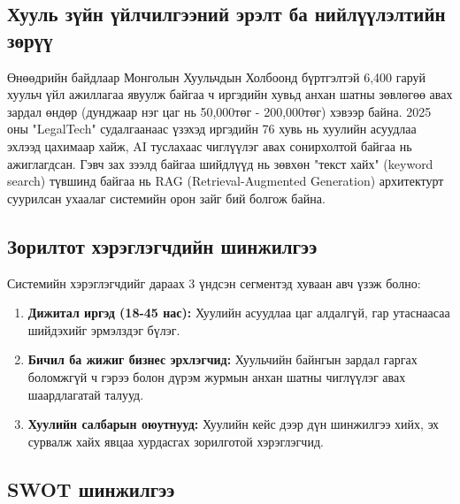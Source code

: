 \subsection{Хууль зүйн үйлчилгээний эрэлт ба нийлүүлэлтийн зөрүү}

Өнөөдрийн байдлаар Монголын Хуульчдын Холбоонд бүртгэлтэй 6,400 гаруй хуульч үйл ажиллагаа явуулж байгаа ч иргэдийн хувьд анхан шатны зөвлөгөө авах зардал өндөр (дунджаар нэг цаг нь 50,000төг - 200,000төг) хэвээр байна. 2025 оны "LegalTech" судалгаанаас үзэхэд иргэдийн 76 хувь нь хуулийн асуудлаа эхлээд цахимаар хайж, AI туслахаас чиглүүлэг авах сонирхолтой байгаа нь ажиглагдсан. Гэвч зах зээлд байгаа шийдлүүд нь зөвхөн "текст хайх" (keyword search) түвшинд байгаа нь RAG (Retrieval-Augmented Generation) архитектурт суурилсан ухаалаг системийн орон зайг бий болгож байна.
\subsection{Зорилтот хэрэглэгчдийн шинжилгээ}

Системийн хэрэглэгчдийг дараах 3 үндсэн сегментэд хуваан авч үзэж болно:

\begin{enumerate}
    \item \textbf{Дижитал иргэд (18-45 нас):} Хуулийн асуудлаа цаг алдалгүй, гар утаснаасаа шийдэхийг эрмэлздэг бүлэг.
    
    \item \textbf{Бичил ба жижиг бизнес эрхлэгчид:} Хуульчийн байнгын зардал гаргах боломжгүй ч гэрээ болон дүрэм журмын анхан шатны чиглүүлэг авах шаардлагатай талууд.
    
    \item \textbf{Хуулийн салбарын оюутнууд:} Хуулийн кейс дээр дүн шинжилгээ хийх, эх сурвалж хайх явцаа хурдасгах зорилготой хэрэглэгчид.
\end{enumerate}
\subsection{SWOT шинжилгээ}

